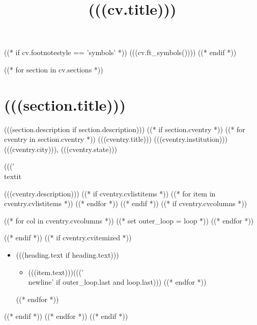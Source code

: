 \documentclass[11pt,letterpaper,roman]{moderncv}
\title{(((cv.title)))}
\begin{document}
\makecvtitle

((* if cv.footnotestyle == 'symbols' *))
(((cv.ft_symbols())))
((* endif *))

((* for section in cv.sections *))
\section{(((section.title)))}
(((section.description if section.description)))
    ((* if section.cventry *))
        ((* for cventry in section.cventry *))
    {(((cventry.title)))}
    {(((cventry.institution)))}
    {(((cventry.city))), (((cventry.state)))}
    {((('\\textit{%
    {(((cventry.description)))}
        ((* if cventry.cvlistitems *))
            ((* for item in cventry.cvlistitems *))
            ((* endfor *))
        ((* endif *))
        ((* if cventry.cvcolumns *))
\begin{cvcolumns}
            ((* for col in cventry.cvcolumns *))
            ((* set outer_loop = loop *))
            ((* endfor *))  
\end{cvcolumns}
        ((* endif *))
        ((* if cventry.cvitemized *))
\begin{itemize}
           ((* for heading in cventry.cvitemized *))
           ((* set outer_loop = loop *))
    \item (((heading.text if heading.text)))
        \begin{itemize}
               ((* for item in heading.items *))
           \item (((item.text)))((('\\newline{}' if outer_loop.last and loop.last)))
               ((* endfor *))
        \end{itemize}
        ((* endfor *))
\end{itemize}
        ((* endif *))
        ((* endfor *))   %
    ((* endif *))

}}
\end{document}
